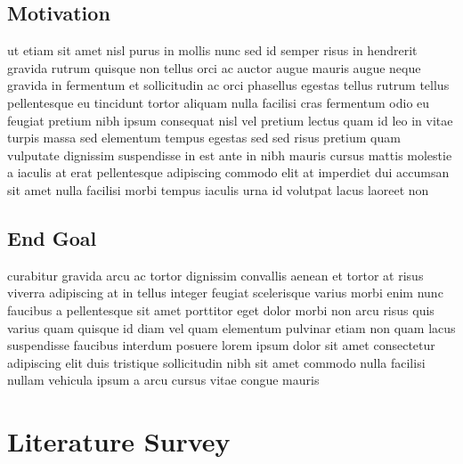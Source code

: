 \documentclass[runningheads]{llncs}
\begin{document}
    \subsection{Motivation}
        ut etiam sit amet nisl purus in mollis nunc sed id semper risus in hendrerit gravida rutrum quisque non tellus orci ac auctor augue mauris augue neque gravida in fermentum et sollicitudin ac orci phasellus egestas tellus rutrum tellus pellentesque eu tincidunt tortor aliquam nulla facilisi cras fermentum odio eu feugiat pretium nibh ipsum consequat nisl vel pretium lectus quam id leo in vitae turpis massa sed elementum tempus egestas sed sed risus pretium quam vulputate dignissim suspendisse in est ante in nibh mauris cursus mattis molestie a iaculis at erat pellentesque adipiscing commodo elit at imperdiet dui accumsan sit amet nulla facilisi morbi tempus iaculis urna id volutpat lacus laoreet non

    \subsection{End Goal}
        curabitur gravida arcu ac tortor dignissim convallis aenean et tortor at risus viverra adipiscing at in tellus integer feugiat scelerisque varius morbi enim nunc faucibus a pellentesque sit amet porttitor eget dolor morbi non arcu risus quis varius quam quisque id diam vel quam elementum pulvinar etiam non quam lacus suspendisse faucibus interdum posuere lorem ipsum dolor sit amet consectetur adipiscing elit duis tristique sollicitudin nibh sit amet commodo nulla facilisi nullam vehicula ipsum a arcu cursus vitae congue mauris


\section{Literature Survey}
\end{document}
